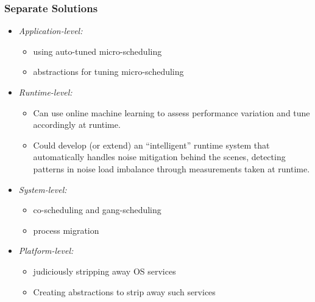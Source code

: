 \begin{frame}
\frametitle{Separate Solutions}
  \begin{itemize}

  \item \textit{Application-level:} 
    \begin{itemize}
    \item using auto-tuned micro-scheduling
    \item abstractions for tuning micro-scheduling
    \end{itemize}

  \item \textit{Runtime-level:} 
    \begin{itemize}
    \item Can use online machine learning to assess performance variation and tune accordingly at runtime. 
    \item Could develop (or extend) an ``intelligent'' runtime system that automatically handles noise mitigation behind the scenes, detecting patterns in noise load imbalance through measurements taken at runtime. 
    \end{itemize}


  \item \textit{System-level:}
    \begin{itemize}
    \item co-scheduling and gang-scheduling 
    \item process migration
    \end{itemize}


  \item \textit{Platform-level:}
    \begin{itemize}
    \item judiciously stripping away OS services
    \item Creating abstractions to strip away such services
    \end{itemize}
  \end{itemize}
\end{frame}

